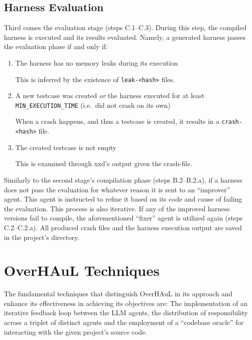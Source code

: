 \documentclass[
  a4paper,
]{scrreprt}
\theoremstyle{definition}
\theoremstyle{remark}
\begin{document}
\subsection{Harness Evaluation}\label{sec-evaluation}

Third comes the evaluation stage (steps C.1--C.3). During this step, the
compiled harness is executed and its results evaluated. Namely, a
generated harness passes the evaluation phase if and only if:

\begin{enumerate}
\def\labelenumi{\arabic{enumi}.}
\item
  The harness has no memory leaks during its execution

  This is inferred by the existence of
  \texttt{leak-\textless{}hash\textgreater{}} files.
\item
  A new testcase was created \emph{or} the harness executed for at least
  \texttt{MIN\_EXECUTION\_TIME} (i.e.~did not crash on its own)

  When a crash happens, and thus a testcase is created, it results in a
  \texttt{crash-\textless{}hash\textgreater{}} file.
\item
  The created testcase is not empty

  This is examined through xxd's output given the crash-file.
\end{enumerate}

Similarly to the second stage's compilation phase (steps B.2--B.2.a), if
a harness does not pass the evaluation for whatever reason it is sent to
an ``improver'' agent. This agent is instructed to refine it based on
its code and cause of failing the evaluation. This process is also
iterative. If any of the improved harness versions fail to compile, the
aforementioned ``fixer'' agent is utilized again (steps C.2--C.2.a). All
produced crash files and the harness execution output are saved in the
project's directory.

\section{OverHAuL Techniques}\label{sec-techniques}

The fundamental techniques that distinguish OverHAuL in its approach and
enhance its effectiveness in achieving its objectives are: The
implementation of an iterative feedback loop between the LLM agents, the
distribution of responsibility across a triplet of distinct agents and
the employment of a ``codebase oracle'' for interacting with the given
project's source code.
\end{document}
